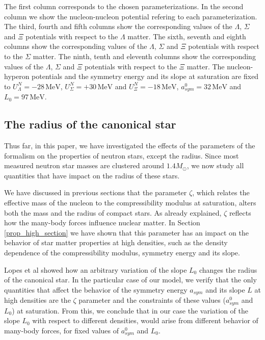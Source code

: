 \documentclass[twocolumn,showpacs,aps]{revtex4}
\begin{document}
\begin{table}[t]
{The first column corresponds to the chosen parameterizations.
In the second column we show the nucleon-nucleon potential refering to each parameterization.
The third, fourth and fifth columns show the corresponding values of the $\Lambda$, $\Sigma$ and $\Xi$ potentials with respect to the $\Lambda$ matter.
The sixth, seventh and eighth columns show the corresponding values of the $\Lambda$, $\Sigma$ and $\Xi$ potentials with respect to the $\Sigma$ matter.
The ninth, tenth and eleventh columns show the corresponding values of the $\Lambda$, $\Sigma$ and $\Xi$ potentials with respect to the $\Xi$ matter.
The nucleon-hyperon potentials and the symmetry energy and its slope at saturation are fixed to
$U_{\Lambda}^N=-28\, \mathrm{MeV}$, $U_{\Sigma}^N=+30\, \mathrm{MeV}$ and $U_{\Xi}^N=-18\, \mathrm{MeV}$, $a_{sym}^0= 32\, \mathrm{MeV}$ and $L_0=97\, \mathrm{MeV}$. } \label{tab_Ypotentials}
\end{table}
\normalsize

\subsection{The radius of the canonical star} \label{radius_section}

Thus far, in this paper, we have investigated the effects of the parameters of the formalism on
the properties of neutron stars, except the radius.
Since most measured neutron star masses are clustered around 
$1.4M_{\odot}$, we now study all quantities that have impact on the radius of these stars.

We have discussed in previous sections that the parameter $\zeta$, which relates the effective mass
of the nucleon to the compressibility modulus at saturation, alters both the mass and the radius of compact stars.
As already explained, $\zeta$ reflects how the many-body forces influence nuclear matter.
In Section \ref{prop_high_section} we have shown that this parameter
has an impact on the behavior of star matter properties at high densities,
such as the density dependence of the compressibility modulus, symmetry energy and its slope.

Lopes et al \cite{Lopes:2014wda} showed how an arbitrary variation of the slope $L_0$ changes the radius of the
canonical star. In the particular case of our model, we verify that the only quantities that affect the behavior of
the symmetry energy $a_{sym}$ and its slope $L$ at high densities are the $\zeta$ parameter and 
the constraints of these values ($a_{sym}^0$ and $L_0$) at saturation. 
From this, we conclude that in our case the variation of the slope $L_0$ with respect to different densities, 
would arise from different behavior of many-body forces, for fixed values of $a_{sym}^0$ and $L_0$.
\end{document}

